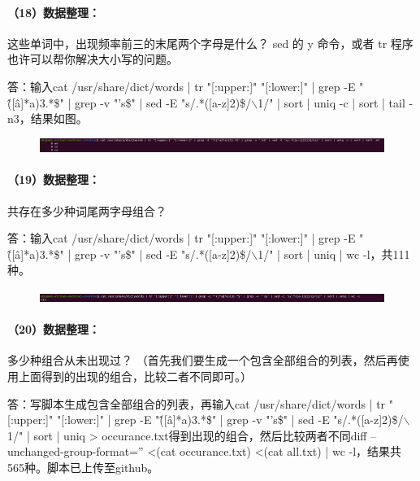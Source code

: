 \documentclass[a4paper, 12pt]{article}
\begin{document}
	\paragraph{（18）数据整理：}	
	这些单词中，出现频率前三的末尾两个字母是什么？ sed 的 y 命令，或者 tr 程序也许可以帮你解决大小写的问题。
	
	答：输入cat /usr/share/dict/words | tr "[:upper:]" "[:lower:]" | grep -E "\^([\^a]*a){3}.*\$" | grep -v "'s\$" | sed -E "s/.*([a-z]{2})\$/$\backslash$1/" | sort | uniq -c | sort | tail -n3，结果如图。
	
	\begin{figure}[H]
		\centering
		\includegraphics[width=1\textwidth]{043.jpg}
	\end{figure}
	
	\paragraph{（19）数据整理：}
	共存在多少种词尾两字母组合？
	
	答：输入cat /usr/share/dict/words | tr "[:upper:]" "[:lower:]" | grep -E "\^([\^a]*a){3}.*\$" | grep -v "'s\$" | sed -E "s/.*([a-z]{2})\$/$\backslash$1/" | sort | uniq | wc -l，共111种。
	
	\begin{figure}[H]
		\centering
		\includegraphics[width=1\textwidth]{044.jpg}
	\end{figure}
	
	\paragraph{（20）数据整理：}
	多少种组合从未出现过？ （首先我们要生成一个包含全部组合的列表，然后再使用上面得到的出现的组合，比较二者不同即可。）
	
	答：写脚本生成包含全部组合的列表，再输入cat /usr/share/dict/words | tr "[:upper:]" "[:lower:]" | grep -E "\^([\^a]*a){3}.*\$" | grep -v "'s\$" | sed -E "s/.*([a-z]{2})\$/$\backslash$1/" | sort | uniq > occurance.txt得到出现的组合，然后比较两者不同diff --unchanged-group-format='' <(cat occurance.txt) <(cat all.txt) | wc -l，结果共565种。脚本已上传至github。
	
\end{document}
